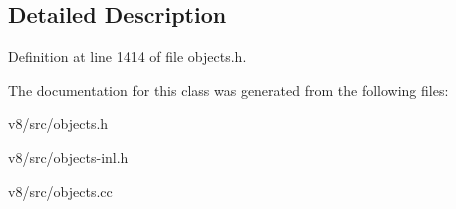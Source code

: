 \subsection{Detailed Description}


Definition at line 1414 of file objects.\+h.



The documentation for this class was generated from the following files\+:\begin{DoxyCompactItemize}
\item 
v8/src/objects.\+h\item 
v8/src/objects-\/inl.\+h\item 
v8/src/objects.\+cc\end{DoxyCompactItemize}
